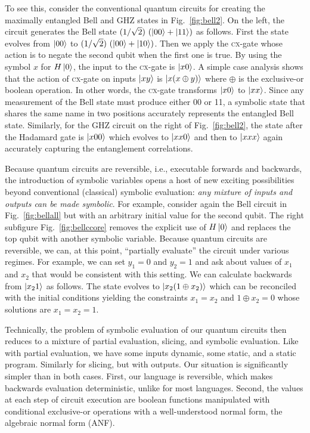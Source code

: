 \documentclass[sigplan,review]{acmart}
\newcommand{\cx}{\textsc{cx}}
\theoremstyle{definition}
\begin{document}
To see this, consider the conventional quantum circuits for creating
the maximally entangled Bell and GHZ states in
Fig.~\ref{fig:bell2}. On the left, the circuit generates the Bell
state $(1/\sqrt{2})~ (\ket{00} + \ket{11})$ as follows. First the state
evolves from $\ket{00}$ to $(1/\sqrt{2})~ (\ket{00} + \ket{10})$. Then
we apply the \cx-gate whose action is to negate the second qubit when
the first one is true. By using the symbol $x$ for $H\ket{0}$, the
input to the \cx-gate is $\ket{x0}$. A simple case analysis shows that
the action of \cx-gate on inputs $\ket{xy}$ is $\ket{x(x \oplus y)}$
where $\oplus$ is the exclusive-or boolean operation. In other words,
the \cx-gate transforms $\ket{x0}$ to $\ket{xx}$. Since any
measurement of the Bell state must produce either 00 or 11, 
a symbolic state that shares the same name in two positions
accurately represents the entangled Bell state. Similarly,
for the GHZ circuit on the right of Fig.~\ref{fig:bell2}, the state
after the Hadamard gate is $\ket{x00}$ which evolves to $\ket{xx0}$
and then to $\ket{xxx}$ again accurately capturing the entanglement
correlations.

Because quantum circuits are reversible, i.e., executable forwards
and backwards, the introduction of symbolic variables opens a host of
new exciting possibilities beyond conventional (classical) symbolic
evaluation: \emph{any mixture of inputs and outputs can be made
  symbolic}. For example, consider again the Bell circuit in
Fig.~\ref{fig:bellall} but with an arbitrary initial value for the second
qubit. The right subfigure Fig.~\ref{fig:bellccore} removes the
explicit use of $H\ket{0}$ and replaces the top qubit with another
symbolic variable. Because quantum circuits are reversible, we can, at
this point, ``partially evaluate'' the circuit under various
regimes. For example, we can set $y_1=0$ and $y_2=1$ and ask about
values of $x_1$ and $x_2$ that would be consistent with this
setting. We can calculate backwards from $\ket{x_21}$ as follows. The
state evolves to $\ket{x_2(1 \oplus x_2)}$ which can be reconciled
with the initial conditions yielding the constraints $x_1=x_2$ and
$1 \oplus x_2 = 0$ whose solutions are $x_1 = x_2 = 1$.

Technically, the problem of symbolic evaluation of our quantum
circuits then reduces to a mixture of partial evaluation, slicing, and
symbolic evaluation. Like with partial evaluation, we have some inputs
dynamic, some static, and a static program. Similarly for slicing, but
with outputs. Our situation is significantly simpler than in both
cases. First, our language is reversible, which makes backwards
evaluation deterministic, unlike for most languages. Second, the
values at each step of circuit execution are boolean functions
manipulated with conditional exclusive-or operations with a
well-understood normal form, the algebraic normal form (ANF). 
\end{document}
